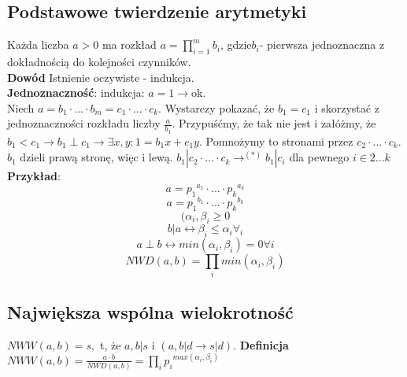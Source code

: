 \documentclass[12pt,a4paper,article]{memoir} %
\begin{document}
\subsection{Podstawowe twierdzenie arytmetyki}
Każda liczba $a>0$ ma rozkład $a=\prod_{i=1}^{m} b_i$, gdzie$ b_i $- pierwsza jednoznaczna z dokładnością do kolejności czynników. \\
\textbf{Dowód} Istnienie oczywiste - indukcja. \\
\textbf{Jednoznaczność}:
indukcja: $a=1 \rightarrow $ok. \\
Niech $ a=b_1 \cdot ... \cdot b_m = c_1 \cdot ... \cdot c_k $. Wystarczy pokazać, że $b_1 = c_1$ i skorzystać z jednoznaczności rozkładu liczby $\frac{a}{b_1}$. Przypuśćmy, że tak nie jest i załóżmy, że $b_1 < c_1 \rightarrow b_1 \perp c_1 \rightarrow \exists x, y: 1 = b_1 x + c_1 y $.
 Pomnożymy to stronami przez $c_2 \cdot ... \cdot c_k $. $b_1$ dzieli prawą stronę, więc i lewą.
$ b_1 | c_2 \cdot ... \cdot c_k \rightarrow^{(*)} b_1 | c_i$ dla pewnego $i \in {{} 2 ... k{}} $ \\
\textbf{Przykład}:  \[ a = {p_1}^{a_1} \cdot ... \cdot {p_k}^{a_k} \] 
\[ a = {p_1}^{b_1} \cdot ... \cdot {p_k}^{b_k} \] 
\[ (\alpha_i, \beta_i \geq 0 \]
\[ b | a \leftrightarrow \beta_i \leq \alpha_i \forall_i \]
\[ a \perp b \leftrightarrow min (\alpha_i, \beta_i) = 0 \forall i \]
\[ NWD (a,b) = \prod_{i} min(\alpha_i, \beta_i) \]
\subsection{Największa wspólna wielokrotność}
$ NWW (a,b) = s,$ t, że $a,b | s$ i $(a,b|d \rightarrow s | d)$.
\textbf{Definicja} $NWW (a,b) = \frac{a \cdot b}{NWD(a,b)} = \prod_i {p_i}^{max(\alpha_i, \beta_i)} $ \\
\end{document}
